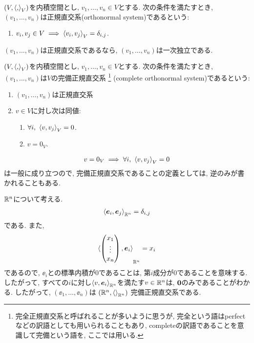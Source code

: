 \begin{definition}
  $(V,\Braket{,}_V)$を内積空間とし,
  $v_1,\ldots,v_n\in V$とする.
  次の条件を満たすとき,
  $(v_1,\ldots,v_n)$は正規直交系(orthonormal system)であるという:
  \begin{enumerate}
    \item $v_i,v_j\in V\implies \Braket{v_i,v_j}_V=\delta_{i,j}$.
  \end{enumerate}
\end{definition}
\begin{remark}
  $(v_1,\ldots,v_n)$は正規直交系であるなら,
  $(v_1,\ldots,v_n)$は一次独立である.
\end{remark}
\begin{definition}
  $(V,\Braket{,}_V)$を内積空間とし,
  $v_1,\ldots,v_n\in V$とする.
  次の条件を満たすとき,
  $(v_1,\ldots,v_n)$は$V$の完備正規直交系%
  \footnote{完全正規直交系と呼ばれることが多いように思うが, 完全という語はperfectなどの訳語としても用いられることもあり, completeの訳語であることを意識して完備という語を, ここでは用いる.}%
  (complete orthonormal system)であるという:
  \begin{enumerate}
    \item $(v_1,\ldots,v_n)$は正規直交系
    \item $v\in V$に対し次は同値:
      \begin{enumerate}
      \item $\forall i,\  \Braket{v,v_j}_V=0$.
      \item $v=0_V$.
      \end{enumerate}
  \end{enumerate}
\end{definition}
\begin{remark}
  \begin{align*}
    v=0_V\implies \forall i,\  \Braket{v,v_j}_V=0
  \end{align*}
  は一般に成り立つので,
  完備正規直交系であることの定義としては,
  逆のみが書かれることもある.
\end{remark}
\begin{example}
  $\mathbb{R}^n$について考える.
  \begin{align*}
    \Braket{\boldsymbol{e}_i,\boldsymbol{e}_j}_{\mathbb{R}^n}=\delta_{i,j}
  \end{align*}
  である.
  また,
  \begin{align*}
    \braket{\begin{pmatrix}x_1\\\vdots\\x_n\end{pmatrix},\boldsymbol{e}_i}_{\mathbb{R}^n}
    =x_i
  \end{align*}
  であるので, $\ee_i$との標準内積が0であることは,
  第$i$成分が0であることを意味する.
  したがって,
  すべての$i$に対し$\Braket{v,\boldsymbol{e}_i}_{\mathbb{R}^n}$を満たす$v\in\mathbb{R}^n$は,
  $\boldsymbol{0}$のみであることがわかる.
  したがって,
  $(\ee_1,\ldots,\ee_n)$は
  $(\mathbb{R}^n,\Braket{}_{\mathbb{R}^n})$
  完備正規直交系である.
\end{example}
